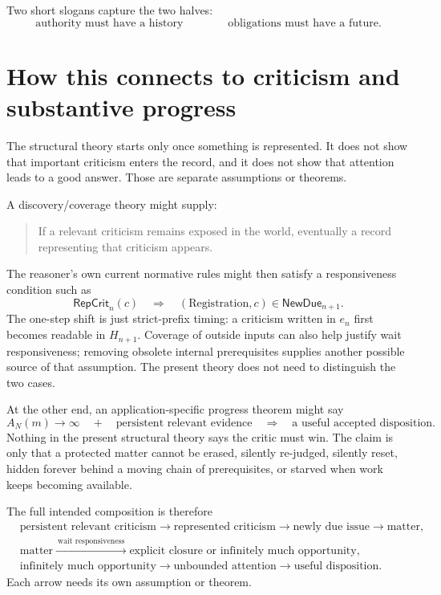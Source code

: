 \documentclass[11pt]{article}
\theoremstyle{definition}
\theoremstyle{remark}
\newcommand{\NewDue}{\mathsf{NewDue}}
\newcommand{\RepCrit}{\mathsf{RepCrit}}
\begin{document}
Two short slogans capture the two halves:
\[
 \boxed{\text{authority must have a history}}
 \qquad\qquad
 \boxed{\text{obligations must have a future}}.
\]

\section{How this connects to criticism and substantive progress}\label{sec:updown}

The structural theory starts only once something is represented. It does not
show that important criticism enters the record, and it does not show that
attention leads to a good answer. Those are separate assumptions or theorems.

A discovery/coverage theory might supply:
\begin{quote}
If a relevant criticism remains exposed in the world, eventually a record
representing that criticism appears.
\end{quote}
The reasoner's own current normative rules might then satisfy a responsiveness
condition such as
\[
 \RepCrit_n(c)
 \quad\Longrightarrow\quad
 (\mathrm{Registration},c)\in\NewDue_{n+1}.
\]
The one-step shift is just strict-prefix timing: a criticism written in $e_n$
first becomes readable in $H_{n+1}$. Coverage of outside inputs can also help
justify wait responsiveness; removing obsolete internal prerequisites supplies
another possible source of that assumption. The present theory does not need to
distinguish the two cases.

At the other end, an application-specific progress theorem might say
\[
 A_N(m)\to\infty
 \quad+\quad
 \text{persistent relevant evidence}
 \quad\Longrightarrow\quad
 \text{a useful accepted disposition}.
\]
Nothing in the present structural theory says the critic must win. The claim is
only that a protected matter cannot be erased, silently re-judged, silently
reset, hidden forever behind a moving chain of prerequisites, or starved when
work keeps becoming available.

The full intended composition is therefore
\[
\begin{aligned}
&\text{persistent relevant criticism}
  \longrightarrow \text{represented criticism}
  \longrightarrow \text{newly due issue}
  \longrightarrow \text{matter},\\[4pt]
&\text{matter}
  \xrightarrow{\ \text{wait responsiveness}\ } \text{explicit closure or infinitely much opportunity},\\[4pt]
&\text{infinitely much opportunity}
  \longrightarrow \text{unbounded attention}
  \longrightarrow \text{useful disposition}.
\end{aligned}
\]
Each arrow needs its own assumption or theorem.
\end{document}
